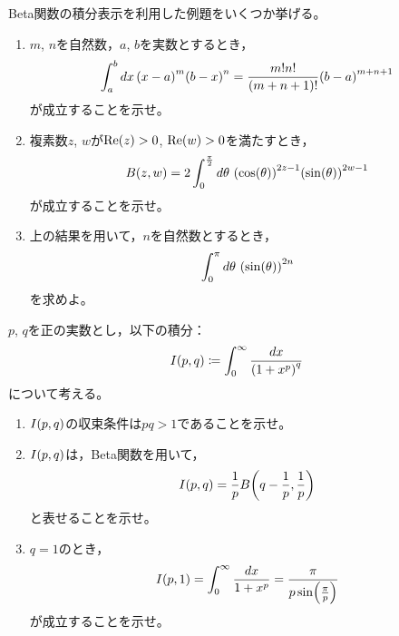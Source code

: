 \documentclass[a4paper,draft]{ltjsarticle}
\begin{document}
\begin{prob}\label{prob-gamma:ベータ関数の積分公式}
    Beta関数の積分表示を利用した例題をいくつか挙げる。
    \begin{enumerate}[label=(\arabic*)]
        \item $m$, $n$を自然数，$a$, $b$を実数とするとき，
        \begin{equation}
            \int_a^b dx\, \pare{x-a}^m \pare{b-x}^n = \frac{m!n!}{\pare{m+n+1}!}\pare{b-a}^{m+n+1}
        \end{equation}
        が成立することを示せ。

        \item 複素数$z$, $w$が$\re{z}>0$, $\re{w}>0$を満たすとき，
        \begin{equation}
            \fun{B}{z,w}=2\int_0^{\frac{\pi}{2}}d\theta\ \pare{\fun{\cos}{\theta}}^{2z-1}\pare{\fun{\sin}{\theta}}^{2w-1}
        \end{equation}
        が成立することを示せ。

        \item 上の結果を用いて，$n$を自然数とするとき，
        \begin{equation}
            \int_0^\pi d\theta\ \pare{\fun{\sin}{\theta}}^{2n}
        \end{equation}
        を求めよ。
    \end{enumerate}
\end{prob}

\begin{prob}
    $p$, $q$を正の実数とし，以下の積分：
    \begin{equation}
        \fun{I}{p,q}\coloneqq \int_0^\infty \frac{dx}{\pare{1+x^p}^q}
    \end{equation}    
    について考える。
    \begin{enumerate}[label=(\arabic*)]
        \item $\fun{I}{p,q}$の収束条件は$pq>1$であることを示せ。
        \item $\fun{I}{p,q}$は，Beta関数を用いて，
        \begin{equation}
            \fun{I}{p,q}=\frac{1}{p}\fun{B}{q-\frac{1}{p}, \frac{1}{p}}
        \end{equation}
        と表せることを示せ。
        \item $q=1$のとき，
        \begin{equation}
            \fun{I}{p,1}=\int_0^\infty \frac{dx}{1+x^p}=\frac{\pi}{p\fun{\sin}{\frac{\pi}{p}}}
        \end{equation}
        が成立することを示せ。
    \end{enumerate}
\end{prob}
\end{document}
